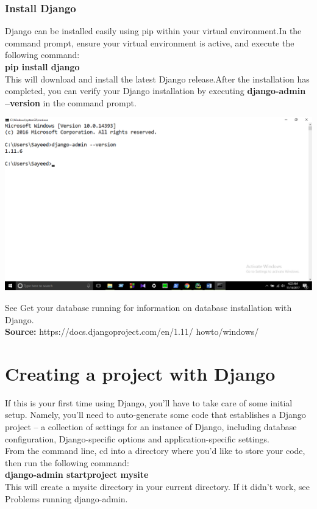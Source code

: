 \documentclass[11pt]{article}
\begin{document}
\begin{multicols}{2}
\subsubsection{Install Django}
Django can be installed easily using pip within your virtual environment.In the command prompt, ensure your virtual environment is active, and execute the following command:
\\	\textbf{pip install django}
\\This will download and install the latest Django release.After the installation has completed, you can verify your Django installation by executing \textbf{django-admin --version} in the command prompt.
\begin{center}
\includegraphics[scale=0.2]{9.png} \\ 
\end{center}
See Get your database running for information on database installation with Django.
\\	\textbf{Source:} https://docs.djangoproject.com/en/1.11/ howto/windows/
\section{Creating a project with Django}
If this is your first time using Django, you'll have to take care of some initial setup. Namely, you'll need to auto-generate some code that establishes a Django project – a collection of settings for an instance of Django, including database configuration, Django-specific options and application-specific settings.
\\From the command line, cd into a directory where you'd like to store your code, then run the following command:
\\	\textbf{django-admin startproject mysite}
\\This will create a mysite directory in your current directory. If it didn't work, see Problems running django-admin.

\end{multicols}
\end{document}
